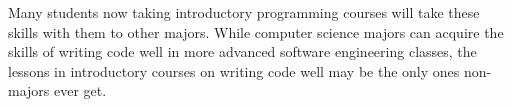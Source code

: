 Many students now taking introductory programming courses will take these skills with them to other majors. While computer science majors can acquire the skills of writing code well in more advanced software engineering classes, the lessons in introductory courses on writing code well may be the only ones non-majors ever get.













